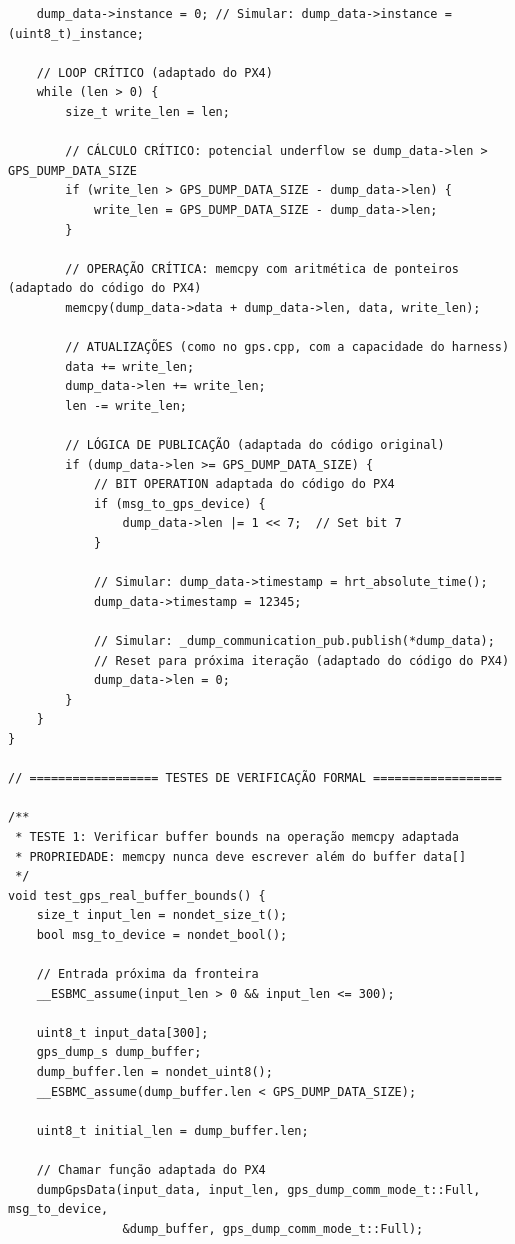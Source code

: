 \begin{lstlisting}
    dump_data->instance = 0; // Simular: dump_data->instance = (uint8_t)_instance;

    // LOOP CRÍTICO (adaptado do PX4)
    while (len > 0) {
        size_t write_len = len;

        // CÁLCULO CRÍTICO: potencial underflow se dump_data->len > GPS_DUMP_DATA_SIZE
        if (write_len > GPS_DUMP_DATA_SIZE - dump_data->len) {
            write_len = GPS_DUMP_DATA_SIZE - dump_data->len;
        }

        // OPERAÇÃO CRÍTICA: memcpy com aritmética de ponteiros (adaptado do código do PX4)
        memcpy(dump_data->data + dump_data->len, data, write_len);
        
        // ATUALIZAÇÕES (como no gps.cpp, com a capacidade do harness)
        data += write_len;
        dump_data->len += write_len;
        len -= write_len;

        // LÓGICA DE PUBLICAÇÃO (adaptada do código original)
        if (dump_data->len >= GPS_DUMP_DATA_SIZE) {
            // BIT OPERATION adaptada do código do PX4
            if (msg_to_gps_device) {
                dump_data->len |= 1 << 7;  // Set bit 7
            }

            // Simular: dump_data->timestamp = hrt_absolute_time();
            dump_data->timestamp = 12345;
            
            // Simular: _dump_communication_pub.publish(*dump_data);
            // Reset para próxima iteração (adaptado do código do PX4)
            dump_data->len = 0;
        }
    }
}

// ================== TESTES DE VERIFICAÇÃO FORMAL ==================

/**
 * TESTE 1: Verificar buffer bounds na operação memcpy adaptada
 * PROPRIEDADE: memcpy nunca deve escrever além do buffer data[]
 */
void test_gps_real_buffer_bounds() {
    size_t input_len = nondet_size_t();
    bool msg_to_device = nondet_bool();
    
    // Entrada próxima da fronteira
    __ESBMC_assume(input_len > 0 && input_len <= 300);
    
    uint8_t input_data[300];
    gps_dump_s dump_buffer;
    dump_buffer.len = nondet_uint8();
    __ESBMC_assume(dump_buffer.len < GPS_DUMP_DATA_SIZE);
    
    uint8_t initial_len = dump_buffer.len;
    
    // Chamar função adaptada do PX4
    dumpGpsData(input_data, input_len, gps_dump_comm_mode_t::Full, msg_to_device, 
                &dump_buffer, gps_dump_comm_mode_t::Full);
    

\end{lstlisting}

